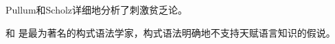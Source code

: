 {Pullum和Scholz详细地分析了刺激贫乏论\citep{PS2002a,SP2002b}。

 \citet{Goldberg2006a}和 \citet{Tomasello2003a}是最为著名的构式语法学家，构式语法明确地不支持天赋语言知识的假说。
}

